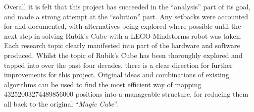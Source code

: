 \documentclass{report}
\newcommand{\tit}[1]{\textit{#1}}
\newcommand{\propernoun}[1]{\enquote{\tit{#1}}}
\newcommand{\lego}{LEGO }
\begin{document}
   Overall it is felt that this project has succeeded in the \enquote{analysis} part of its goal, and made a strong attempt at the \enquote{solution} part. Any setbacks were accounted for and documented, with alternatives being explored where possible until the next step in solving Rubik's Cube with a \lego Mindstorms robot was taken. Each research topic clearly manifested into part of the hardware and software produced. Whilst the topic of Rubik's Cube has been thoroughly explored and tapped into over the past four decades, there is a clear direction for further improvements for this project. Original ideas and combinations of existing algorithms can be used to find the most efficient way of mapping \num{43252003274489856000} positions into a manageable structure, for reducing them all back to the original \propernoun{Magic Cube}.
    
    
    \newpage
    \printbibliography
    
\end{document}
